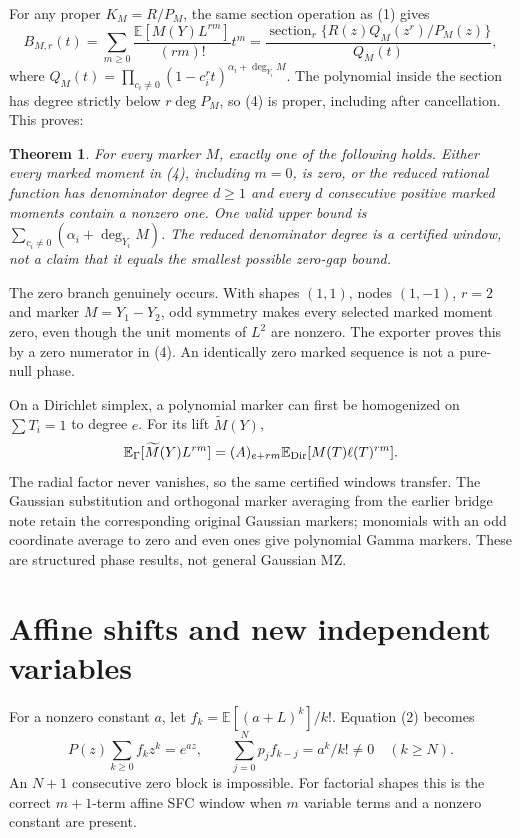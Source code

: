 \documentclass[11pt]{article}
\newtheorem{theorem}{Theorem}
\begin{document}
For any proper $K_M=R/P_M$, the same section operation as (1) gives
\[
 B_{M,r}(t)=\sum_{m\ge0}
       \frac{\mathbb E[M(Y)L^{rm}]}{(rm)!}t^m
       =\frac{\operatorname{section}_r
          \{R(z)Q_M(z^r)/P_M(z)\}}{Q_M(t)},           \tag{4}
\]
where $Q_M(t)=\prod_{c_i\ne0}(1-c_i^r t)^{\alpha_i+\deg_{Y_i}M}$.
The polynomial inside the section has degree strictly below
$r\deg P_M$, so (4) is proper, including after cancellation. This proves:

\begin{theorem}\label{thm:marked}
For every marker $M$, exactly one of the following holds. Either every
marked moment in (4), including $m=0$, is zero, or the reduced rational
function has denominator degree $d\ge1$ and every $d$ consecutive positive
marked moments contain a nonzero one. One valid upper bound is
$\sum_{c_i\ne0}(\alpha_i+\deg_{Y_i}M)$.
The reduced denominator degree is a certified window, not a claim that
it equals the smallest possible zero-gap bound.
\end{theorem}

The zero branch genuinely occurs. With shapes $(1,1)$, nodes $(1,-1)$,
$r=2$ and marker $M=Y_1-Y_2$, odd symmetry makes every selected marked
moment zero, even though the unit moments of $L^2$ are nonzero.
The exporter proves this by a zero numerator in (4). An identically zero
marked sequence is not a pure-null phase.

On a Dirichlet simplex, a polynomial marker can first be homogenized on
$\sum T_i=1$ to degree $e$. For its lift $\widetilde M(Y)$,
\[
 \mathbb E_\Gamma[\widetilde M(Y)L^{rm}]
  =(A)_{e+rm}\mathbb E_{\rm Dir}[M(T)\ell(T)^{rm}].
\]
The radial factor never vanishes, so the same certified windows transfer.
The Gaussian substitution and orthogonal marker averaging from the earlier
bridge note retain the corresponding original Gaussian markers; monomials
with an odd coordinate average to zero and even ones give polynomial Gamma
markers. These are structured phase results, not general Gaussian MZ.

\section{Affine shifts and new independent variables}
For a nonzero constant $a$, let $f_k=\mathbb E[(a+L)^k]/k!$.
Equation (2) becomes
\[
 P(z)\sum_{k\ge0}f_kz^k=e^{az},\qquad
 \sum_{j=0}^Np_jf_{k-j}=a^k/k!\ne0\quad(k\ge N).
\]
An $N+1$ consecutive zero block is impossible. For factorial shapes this
is the correct $m+1$-term affine SFC window when $m$ variable terms and a
nonzero constant are present.
\end{document}
